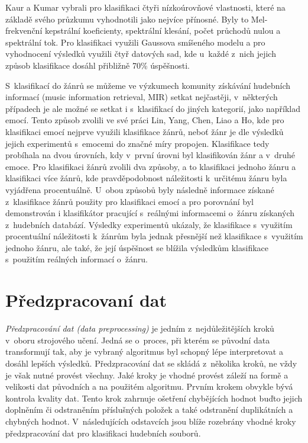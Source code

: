 Kaur a Kumar vybrali pro klasifikaci čtyři nízkoúrovňové vlastnosti, které na základě svého průzkumu vyhodnotili jako nejvíce přínosné. Byly to Mel-frekvenční kepstrální koeficienty, spektrální klesání, počet průchodů nulou a spektrální tok. Pro klasifikaci využili Gaussova smíšeného modelu a pro vyhodnocení výsledků využili čtyř datových sad, kde u~každé z~nich jejich způsob klasifikace dosáhl přibližně 70\% úspěšnosti.\cite{8365395}

S~klasifikací do žánrů se můžeme ve výzkumech komunity získávání hudebních informací (music information retrieval, MIR) setkat nejčastěji, v~některých případech je ale možné se setkat i s~klasifikací do jiných kategorií, jako například emocí. Tento způsob zvolili ve své práci Lin, Yang, Chen, Liao a Ho, kde pro klasifikaci emocí nejprve využili klasifikace žánrů, neboť žánr je dle výsledků jejich experimentů s~emocemi do značné míry propojen. Klasifikace tedy probíhala na dvou úrovních, kdy v~první úrovni byl klasifikován žánr a v~druhé emoce. Pro klasifikaci žánrů zvolili dva způsoby, a to klasifikaci jednoho žánru a klasifikaci více žánrů, kde pravděpodobnost náležitosti k~určitému žánru byla vyjádřena procentuálně. U~obou způsobů byly následně informace získané z~klasifikace žánrů použity pro klasifikaci emocí a pro porovnání byl demonstrován i klasifikátor pracující s~reálnými informacemi o~žánru získaných z~hudebních databází. Výsledky experimentů ukázaly, že klasifikace s~využitím procentuální náležitosti k~žánrům byla jednak přesnější než klasifikace s~využitím jednoho žánru, ale také, že její úspěšnost se blížila výsledkům klasifikace s~použitím reálných informací o~žánru.\cite{5202572}

\chapter{Předzpracovaní dat}
\label{predzpracovani_dat}
\textit{Předzpracování dat (data preprocessing)} je jedním z~nejdůležitějších kroků v~oboru strojového učení. Jedná se o~proces, při kterém se původní data transformují tak, aby je vybraný algoritmus byl schopný lépe interpretovat a dosáhl lepších výsledků. Předzpracování dat se skládá z~několika kroků, ne vždy je však nutné provést všechny. Jaké kroky je vhodné provést záleží na formě a velikosti dat původních a na použitém algoritmu. Prvním krokem obvykle bývá kontrola kvality dat. Tento krok zahrnuje ošetření chybějících hodnot buďto jejich doplněním či odstraněním příslušných položek a také odstranění duplikátních a chybných hodnot. V~následujících odstavcích jsou blíže rozebrány vhodné kroky předzpracování dat pro klasifikaci hudebních souborů.\cite{data_preprocessing}\cite{aca}

